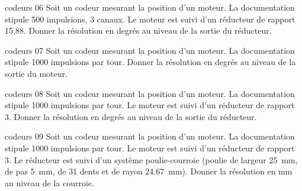 {\begin{question}{codeurs 06}
Soit un codeur mesurant la position d'un moteur. La documentation stipule 500 impulsions, 3 canaux. Le moteur est suivi d'un réducteur de rapport 15,88. Donner la résolution en degrés au niveau de la sortie du réducteur.
\end{question}


\begin{question}{codeurs 07}
Soit un codeur mesurant la position d'un moteur. La documentation stipule 1000 impulsions par tour.  Donner la résolution en degrés au niveau de la sortie du moteur.
\end{question}

\begin{question}{codeurs 08}
Soit un codeur mesurant la position d'un moteur. La documentation stipule 1000 impulsions par tour.  Le moteur est suivi d'un réducteur de rapport 3. Donner la résolution en degrés au niveau de la sortie du réducteur.
\end{question}


\begin{question}{codeurs 09}
Soit un codeur mesurant la position d'un moteur. La documentation stipule 1000 impulsions par tour.  Le moteur est suivi d'un réducteur de rapport 3. Le réducteur est suivi d'un système poulie-courroie (poulie de largeur \SI{25}{mm}, de pas \SI{5}{mm}, de 31 dents et de rayon \SI{24,67}{mm}). Donner la résolution en mm au niveau de la courroie.
\end{question}



}
